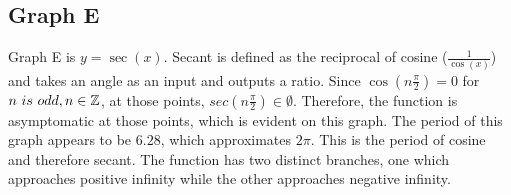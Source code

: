 \subsection{Graph E}

Graph E is $y=\sec(x)$.
Secant is defined as the reciprocal of cosine ($\frac{1}{\cos(x)}$) and takes an angle as an input and outputs a ratio.
Since $\cos(n{\frac{\pi}{2}})=0$ for ${n \ is \  odd, n\in \mathbb{Z}}$, at those points, $sec(n{\frac{\pi}{2}}) {\in \emptyset}$.
Therefore, the function is asymptomatic at those points, which is evident on this graph.
The period of this graph appears to be ${6.28}$, which approximates ${2\pi}$.
This is the period of cosine and therefore secant.
The function has two distinct branches, one which approaches positive infinity while the other approaches negative infinity.
